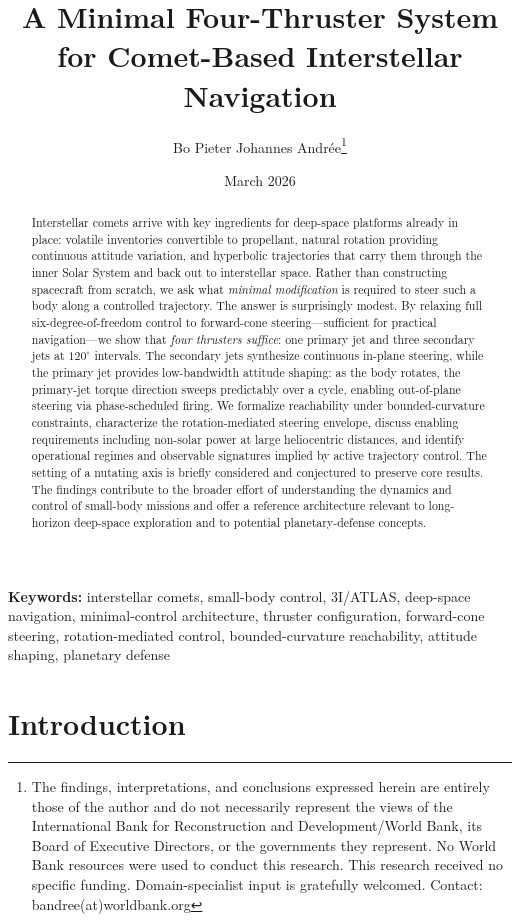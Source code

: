 \documentclass{article}
\title{A Minimal Four-Thruster System for Comet-Based Interstellar Navigation}
\author[1]{Bo Pieter Johannes Andr\'ee\thanks{The findings, interpretations, and conclusions expressed herein are entirely those of the author and do not necessarily represent the views of the International Bank for Reconstruction and Development/World Bank, its Board of Executive Directors, or the governments they represent. No World Bank resources were used to conduct this research. This research received no specific funding. Domain-specialist input is gratefully welcomed. Contact: bandree(at)worldbank.org}}
\affil[1]{Data Group and Multilateral \& UN, World Bank, Geneva, Switzerland.}
\date{March 2026}
\begin{document}
\maketitle

\begin{abstract}
Interstellar comets arrive with key ingredients for deep-space platforms already in place: volatile inventories convertible to propellant, natural rotation providing continuous attitude variation, and hyperbolic trajectories that carry them through the inner Solar System and back out to interstellar space. Rather than constructing spacecraft from scratch, we ask what \emph{minimal modification} is required to steer such a body along a controlled trajectory. The answer is surprisingly modest. By relaxing full six-degree-of-freedom control to forward-cone steering---sufficient for practical navigation---we show that \emph{four thrusters suffice}: one primary jet and three secondary jets at $120^\circ$ intervals. The secondary jets synthesize continuous in-plane steering, while the primary jet provides low-bandwidth attitude shaping: as the body rotates, the primary-jet torque direction sweeps predictably over a cycle, enabling out-of-plane steering via phase-scheduled firing. We formalize reachability under bounded-curvature constraints, characterize the rotation-mediated steering envelope, discuss enabling requirements including non-solar power at large heliocentric distances, and identify operational regimes and observable signatures implied by active trajectory control. The setting of a nutating axis is briefly considered and conjectured to preserve core results. The findings contribute to the broader effort of understanding the dynamics and control of small-body missions and offer a reference architecture relevant to long-horizon deep-space exploration and to potential planetary-defense concepts.
\end{abstract}

\medskip
\noindent
\textbf{Keywords:} interstellar comets, small-body control, 3I/ATLAS, deep-space navigation, minimal-control architecture, thruster configuration, forward-cone steering, rotation-mediated control, bounded-curvature reachability, attitude shaping, planetary defense
\pagebreak


\section{Introduction}
\label{sec:intro}
\end{document}
